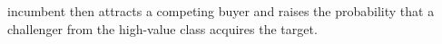 incumbent then attracts a competing buyer and raises the probability
that a challenger from the high-value class acquires the target.
